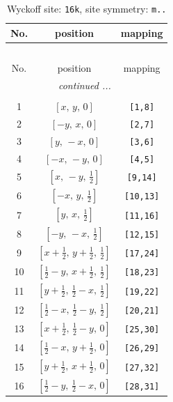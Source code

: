 \documentclass[fleqn,8pt]{jsarticle}
\begin{document}
\renewcommand{\arraystretch}{1.2}
\begin{longtable}{ccc}
\caption{Wyckoff site: {\tt 16k}, site symmetry: {\tt m..}}
 \\
 \hline \hline
No. & position & mapping \\ \hline \endfirsthead

\multicolumn{2}{l}{\tablename\ \thetable{}} \\
 \hline \hline
No. & position & mapping \\ \hline \endhead

 \hline \hline
\multicolumn{2}{r}{\footnotesize\it continued ...} \\ \endfoot

 \hline \hline
\multicolumn{2}{r}{} \\ \endlastfoot

1 & $\left[ x,\, y,\, 0 \right]$ & {\tt [1,8]} \\ \hline
2 & $\left[ - y,\, x,\, 0 \right]$ & {\tt [2,7]} \\ \hline
3 & $\left[ y,\, - x,\, 0 \right]$ & {\tt [3,6]} \\ \hline
4 & $\left[ - x,\, - y,\, 0 \right]$ & {\tt [4,5]} \\ \hline
5 & $\left[ x,\, - y,\, \frac{1}{2} \right]$ & {\tt [9,14]} \\ \hline
6 & $\left[ - x,\, y,\, \frac{1}{2} \right]$ & {\tt [10,13]} \\ \hline
7 & $\left[ y,\, x,\, \frac{1}{2} \right]$ & {\tt [11,16]} \\ \hline
8 & $\left[ - y,\, - x,\, \frac{1}{2} \right]$ & {\tt [12,15]} \\ \hline
9 & $\left[ x + \frac{1}{2},\, y + \frac{1}{2},\, \frac{1}{2} \right]$ & {\tt [17,24]} \\ \hline
10 & $\left[ \frac{1}{2} - y,\, x + \frac{1}{2},\, \frac{1}{2} \right]$ & {\tt [18,23]} \\ \hline
11 & $\left[ y + \frac{1}{2},\, \frac{1}{2} - x,\, \frac{1}{2} \right]$ & {\tt [19,22]} \\ \hline
12 & $\left[ \frac{1}{2} - x,\, \frac{1}{2} - y,\, \frac{1}{2} \right]$ & {\tt [20,21]} \\ \hline
13 & $\left[ x + \frac{1}{2},\, \frac{1}{2} - y,\, 0 \right]$ & {\tt [25,30]} \\ \hline
14 & $\left[ \frac{1}{2} - x,\, y + \frac{1}{2},\, 0 \right]$ & {\tt [26,29]} \\ \hline
15 & $\left[ y + \frac{1}{2},\, x + \frac{1}{2},\, 0 \right]$ & {\tt [27,32]} \\ \hline
16 & $\left[ \frac{1}{2} - y,\, \frac{1}{2} - x,\, 0 \right]$ & {\tt [28,31]} \\
\end{longtable}
\end{document}
